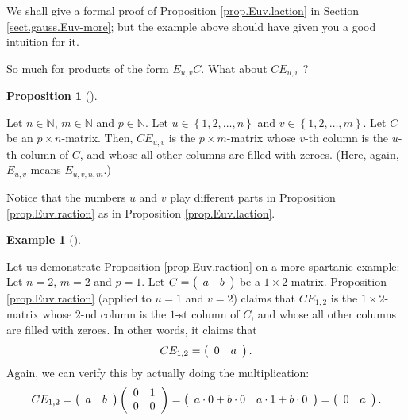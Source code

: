 \documentclass[numbers=enddot,12pt,final,onecolumn,notitlepage]{scrartcl}%
\theoremstyle{definition}
\newtheorem{prop}[theo]{Proposition}
\newenvironment{proposition}[1][]
{\begin{prop}[#1]\begin{leftbar}}
{\end{leftbar}\end{prop}}
\newtheorem{exam}[theo]{Example}
\newenvironment{example}[1][]
{\begin{exam}[#1]\begin{leftbar}}
{\end{leftbar}\end{exam}}
\begin{document}
We shall give a formal proof of Proposition \ref{prop.Euv.laction} in Section
\ref{sect.gauss.Euv-more}; but the example above should have given you a good
intuition for it.

So much for products of the form $E_{u,v}C$. What about $CE_{u,v}$ ?

\begin{proposition}
\label{prop.Euv.raction}Let $n\in\mathbb{N}$, $m\in\mathbb{N}$ and
$p\in\mathbb{N}$. Let $u\in\left\{  1,2,\ldots,n\right\}  $ and $v\in\left\{
1,2,\ldots,m\right\}  $. Let $C$ be an $p\times n$-matrix. Then, $CE_{u,v}$ is
the $p\times m$-matrix whose $v$-th column is the $u$-th column of $C$, and
whose all other columns are filled with zeroes. (Here, again, $E_{u,v}$ means
$E_{u,v,n,m}$.)
\end{proposition}

Notice that the numbers $u$ and $v$ play different parts in Proposition
\ref{prop.Euv.raction} as in Proposition \ref{prop.Euv.laction}.

\begin{example}
Let us demonstrate Proposition \ref{prop.Euv.raction} on a more spartanic
example: Let $n=2$, $m=2$ and $p=1$. Let $C=\left(
\begin{array}
[c]{cc}%
a & b
\end{array}
\right)  $ be a $1\times2$-matrix. Proposition \ref{prop.Euv.raction} (applied
to $u=1$ and $v=2$) claims that $CE_{1,2}$ is the $1\times2$-matrix whose
$2$-nd column is the $1$-st column of $C$, and whose all other columns are
filled with zeroes. In other words, it claims that%
\[
CE_{1,2}=\left(
\begin{array}
[c]{cc}%
0 & a
\end{array}
\right)  .
\]
Again, we can verify this by actually doing the multiplication:%
\[
CE_{1,2}=\left(
\begin{array}
[c]{cc}%
a & b
\end{array}
\right)  \left(
\begin{array}
[c]{cc}%
0 & 1\\
0 & 0
\end{array}
\right)  =\left(
\begin{array}
[c]{cc}%
a\cdot0+b\cdot0 & a\cdot1+b\cdot0
\end{array}
\right)  =\left(
\begin{array}
[c]{cc}%
0 & a
\end{array}
\right)  .
\]

\end{example}
\end{document}
